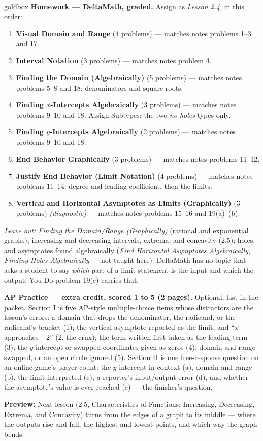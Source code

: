 \documentclass[10pt]{article}
\begin{document}
\begin{skillbox}{goldbox}
\textbf{Homework --- DeltaMath, graded.} Assign as \textit{Lesson 2.4}, in this order:
\begin{enumerate}[itemsep=1pt,topsep=2pt]
  \item \textbf{Visual Domain and Range} (4 problems) --- matches notes problems 1--3 and 17.
  \item \textbf{Interval Notation} (3 problems) --- matches notes problem 4.
  \item \textbf{Finding the Domain (Algebraically)} (5 problems) --- matches notes problems
        5--8 and 18: denominators and square roots.
  \item \textbf{Finding $x$-Intercepts Algebraically} (3 problems) --- matches notes problems
        9--10 and 18. Assign Subtypes: the two \textit{no holes} types only.
  \item \textbf{Finding $y$-Intercepts Algebraically} (2 problems) --- matches notes problems
        9--10 and 18.
  \item \textbf{End Behavior Graphically} (3 problems) --- matches notes problems 11--12.
  \item \textbf{Justify End Behavior (Limit Notation)} (4 problems) --- matches notes problems
        11--14: degree and leading coefficient, then the limits.
  \item \textbf{Vertical and Horizontal Asymptotes as Limits (Graphically)} (3 problems)
        \textit{(diagnostic)} --- matches notes problems 15--16 and 19(a)--(b).
\end{enumerate}
\textit{Leave out:} \textit{Finding the Domain/Range (Graphically)} (rational and exponential
graphs); increasing and decreasing intervals, extrema, and concavity (2.5); holes, and
asymptotes found algebraically (\textit{Find Horizontal Asymptotes Algebraically},
\textit{Finding Holes Algebraically} --- not taught here). DeltaMath has no topic that asks a
student to say \textit{which} part of a limit statement is the input and which the output; You
Do problem 19(c) carries that.

\textbf{AP Practice --- extra credit, scored 1 to 5 (2 pages).} Optional, last in the packet.
Section I is five AP-style multiple-choice items whose distractors are the lesson's errors: a
domain that drops the denominator, the radicand, or the radicand's bracket (1); the vertical
asymptote reported as the limit, and ``$x$ approaches $-2$'' (2, the crux); the term written
first taken as the leading term (3); the $y$-intercept or swapped coordinates given as zeros
(4); domain and range swapped, or an open circle ignored (5). Section II is one free-response
question on an online game's player count: the $y$-intercept in context (a), domain and range
(b), the limit interpreted (c), a reporter's input/output error (d), and whether the asymptote's
value is ever reached (e) --- the finisher's question.

\textbf{Preview:} Next lesson (2.5, Characteristics of Functions: Increasing, Decreasing,
Extrema, and Concavity) turns from the edges of a graph to its middle --- where the outputs rise
and fall, the highest and lowest points, and which way the graph bends.
\end{skillbox}
\end{document}
